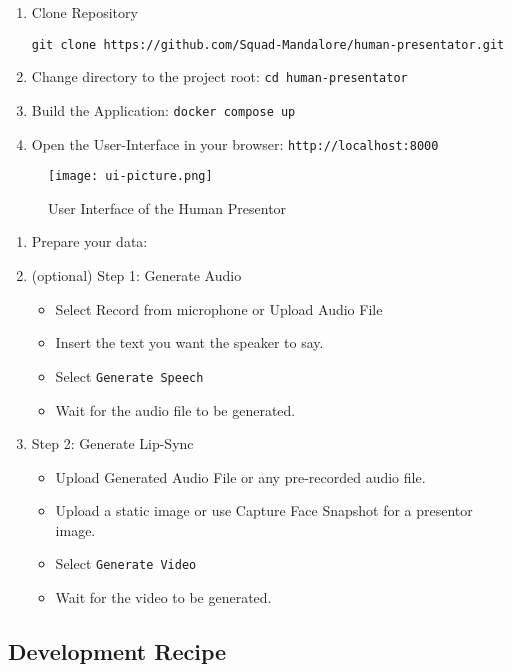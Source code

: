 \begin{enumerate}
  \item Clone Repository

    \texttt{git clone https://github.com/Squad-Mandalore/human-presentator.git}

  \item Change directory to the project root: \texttt{cd human-presentator}
  \item Build the Application: \texttt{docker compose up}
  \item Open the User-Interface in your browser: \texttt{http://localhost:8000}
\end{enumerate}

\begin{figure}[H]
  \centering
  \texttt{[image: ui-picture.png]}
  \caption{User Interface of the Human Presentor}
  \label{fig:architecture}
\end{figure}

\begin{enumerate}
  \item Prepare your data:
  \item (optional) Step 1: Generate Audio
    \begin{itemize}
      \item Select Record from microphone or Upload Audio File
      \item Insert the text you want the speaker to say.
      \item Select \texttt{Generate Speech}
      \item Wait for the audio file to be generated.
    \end{itemize}
  \item Step 2: Generate Lip-Sync
    \begin{itemize}
      \item Upload Generated Audio File or any pre-recorded audio file.
      \item Upload a static image or use Capture Face Snapshot for a presentor image.
      \item Select \texttt{Generate Video}
      \item Wait for the video to be generated.
    \end{itemize}
\end{enumerate}

\subsection{Development Recipe}

